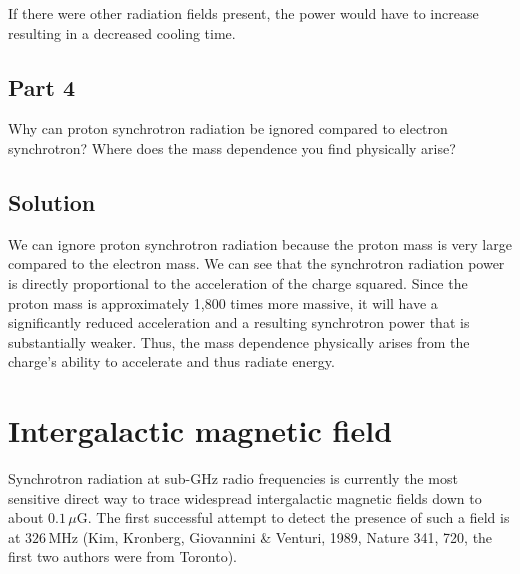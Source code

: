 \documentclass[12pt]{article}
\begin{document}
{\noindent}If there were other radiation fields present, the power would have to increase resulting in a decreased cooling time.


\subsection*{Part 4}

Why can proton synchrotron radiation be ignored compared to electron synchrotron? Where
does the mass dependence you find physically arise?


\subsection*{Solution}

We can ignore proton synchrotron radiation because the proton mass is very large compared to the electron mass. We can see that the synchrotron radiation power is directly proportional to the acceleration of the charge squared. Since the proton mass is approximately 1,800 times more massive, it will have a significantly reduced acceleration and a resulting synchrotron power that is substantially weaker. Thus, the mass dependence physically arises from the charge's ability to accelerate and thus radiate energy.


\section{Intergalactic magnetic field}

Synchrotron radiation at sub-GHz radio frequencies is currently the most sensitive direct way to trace widespread intergalactic magnetic fields down to about $0.1\,\mu\mathrm{G}$. The first successful attempt to detect the presence of such a field is at $326\,\mathrm{MHz}$ (Kim, Kronberg, Giovannini \& Venturi, 1989, Nature 341, 720, the first two authors were from Toronto).
\end{document}
